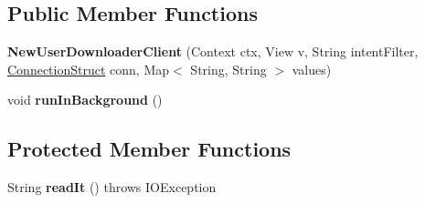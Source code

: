 \subsection*{Public Member Functions}
\begin{DoxyCompactItemize}
\item 
{\bfseries New\+User\+Downloader\+Client} (Context ctx, View v, String intent\+Filter, \hyperlink{classcom_1_1example_1_1sebastian_1_1tindertp_1_1commonTools_1_1ConnectionStruct}{Connection\+Struct} conn, Map$<$ String, String $>$ values)\hypertarget{classcom_1_1example_1_1sebastian_1_1tindertp_1_1internetTools_1_1NewUserDownloaderClient_ac662c59de5cd0cfbd3dccb99a72f3212}{}\label{classcom_1_1example_1_1sebastian_1_1tindertp_1_1internetTools_1_1NewUserDownloaderClient_ac662c59de5cd0cfbd3dccb99a72f3212}

\item 
void {\bfseries run\+In\+Background} ()\hypertarget{classcom_1_1example_1_1sebastian_1_1tindertp_1_1internetTools_1_1NewUserDownloaderClient_a8df92a90ceecde0e8cca447e9ff38234}{}\label{classcom_1_1example_1_1sebastian_1_1tindertp_1_1internetTools_1_1NewUserDownloaderClient_a8df92a90ceecde0e8cca447e9ff38234}

\end{DoxyCompactItemize}
\subsection*{Protected Member Functions}
\begin{DoxyCompactItemize}
\item 
String {\bfseries read\+It} ()  throws I\+O\+Exception \hypertarget{classcom_1_1example_1_1sebastian_1_1tindertp_1_1internetTools_1_1NewUserDownloaderClient_ad4f2e66a0e40651c8ddbc72012362e86}{}\label{classcom_1_1example_1_1sebastian_1_1tindertp_1_1internetTools_1_1NewUserDownloaderClient_ad4f2e66a0e40651c8ddbc72012362e86}

\end{DoxyCompactItemize}
